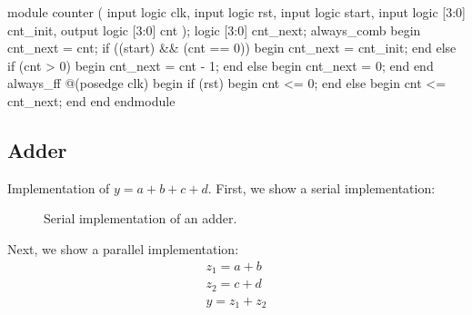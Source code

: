 \documentclass[11pt]{article}
\begin{document}
\begin{systemverilogcode}
  module counter (
    input logic clk,
    input logic rst,
    input logic start,
    input logic [3:0] cnt_init,
    output logic [3:0] cnt
  );
    logic [3:0] cnt_next;
    always_comb begin
      cnt_next = cnt;
      if ((start) && (cnt == 0)) begin
        cnt_next = cnt_init;
      end else if (cnt > 0) begin
        cnt_next = cnt - 1;
      end else begin
        cnt_next = 0;
      end
    end
    always_ff @(posedge clk) begin
      if (rst) begin
        cnt <= 0;
      end else begin
        cnt <= cnt_next;
      end
    end
  endmodule
\end{systemverilogcode}


\subsection{Adder}

Implementation of $y = a + b + c + d$.  First, we show a serial implementation:

\begin{figure}
\centering

  \caption{Serial implementation of an adder.}
  \label{fig:adder_serial}
\end{figure}

Next, we show a parallel implementation:
\begin{align*}
  z_1 = a + b \\
  z_2 = c + d \\
  y = z_1 + z_2
\end{align*}
\end{document}
